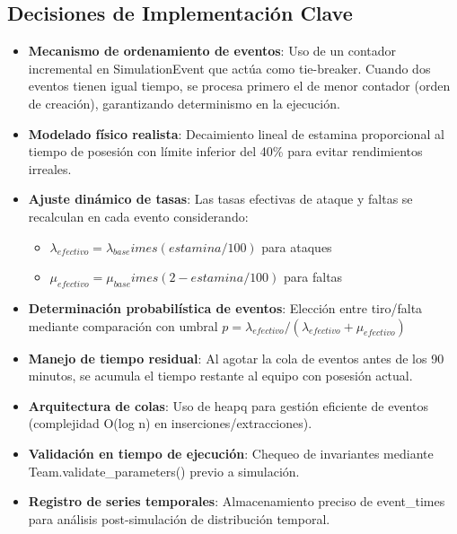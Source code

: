 \documentclass{article}
\begin{document}
\subsection{Decisiones de Implementación Clave}
\begin{itemize}
    \item \textbf{Mecanismo de ordenamiento de eventos}: Uso de un contador incremental en SimulationEvent que actúa como tie-breaker. Cuando dos eventos tienen igual tiempo, se procesa primero el de menor contador (orden de creación), garantizando determinismo en la ejecución.

    \item \textbf{Modelado físico realista}: Decaimiento lineal de estamina proporcional al tiempo de posesión con límite inferior del 40\% para evitar rendimientos irreales.
    
    \item \textbf{Ajuste dinámico de tasas}: Las tasas efectivas de ataque y faltas se recalculan en cada evento considerando:
    \begin{itemize}
        \item $\lambda_{efectivo} = \lambda_{base} 	imes (estamina/100)$ para ataques
        \item $\mu_{efectivo} = \mu_{base} 	imes (2 - estamina/100)$ para faltas
    \end{itemize}
    
    \item \textbf{Determinación probabilística de eventos}: Elección entre tiro/falta mediante comparación con umbral $p = \lambda_{efectivo}/(\lambda_{efectivo} + \mu_{efectivo})$
    
    \item \textbf{Manejo de tiempo residual}: Al agotar la cola de eventos antes de los 90 minutos, se acumula el tiempo restante al equipo con posesión actual.
    
    \item \textbf{Arquitectura de colas}: Uso de heapq para gestión eficiente de eventos (complejidad O(log n) en inserciones/extracciones).
    
    \item \textbf{Validación en tiempo de ejecución}: Chequeo de invariantes mediante Team.validate\_parameters() previo a simulación.
    
    \item \textbf{Registro de series temporales}: Almacenamiento preciso de event\_times para análisis post-simulación de distribución temporal.
\end{itemize}
\end{document}
